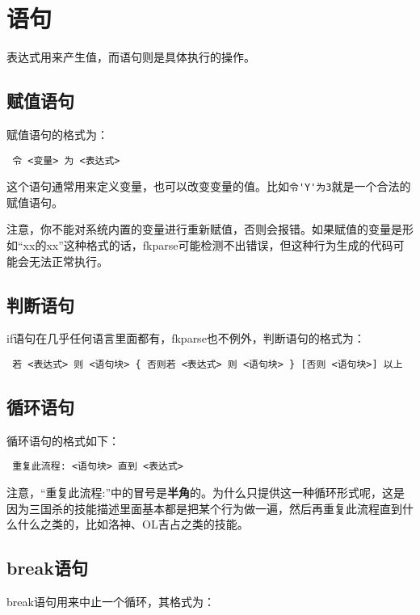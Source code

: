\section{语句}

表达式用来产生值，而语句则是具体执行的操作。

\subsection{赋值语句}

赋值语句的格式为：

\begin{verbatim}
 令 <变量> 为 <表达式>
\end{verbatim}

这个语句通常用来定义变量，也可以改变变量的值。比如\verb|令'Y'为3|就是一个合法的赋值语句。

注意，你不能对系统内置的变量进行重新赋值，否则会报错。如果赋值的变量是形如“xx的xx”这种格式的话，fkparse可能检测不出错误，但这种行为生成的代码可能会无法正常执行。

\subsection{判断语句}

if语句在几乎任何语言里面都有，fkparse也不例外，判断语句的格式为：

\begin{verbatim}
 若 <表达式> 则 <语句块> { 否则若 <表达式> 则 <语句块> } [否则 <语句块>] 以上
\end{verbatim}

\subsection{循环语句}

循环语句的格式如下：

\begin{verbatim}
 重复此流程: <语句块> 直到 <表达式>
\end{verbatim}

注意，“重复此流程:”中的冒号是\textbf{半角}的。为什么只提供这一种循环形式呢，这是因为三国杀的技能描述里面基本都是把某个行为做一遍，然后再重复此流程直到什么什么之类的，比如洛神、OL吉占之类的技能。

\subsection{break语句}

break语句用来中止一个循环，其格式为：

